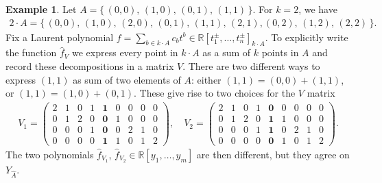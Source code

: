 \documentclass[a4paper,11pt]{amsart}
\theoremstyle{definition}
\newtheorem{example}[theorem]{Example}
\newcommand{\RR}{\mathbb{R}}
\begin{document}
\begin{example}
\label{ex:Vmatrix}
Let $A = \{ \, (0,0), \, (1,0), \, (0,1), \, (1,1) \, \}$. For $k = 2$, we have
\begin{align*}
    2 \cdot A = \{ \, (0,0), \, (1,0), \, (2,0), \, (0,1), \, (1,1), \, (2,1),  (0,2), \, (1,2), \, (2,2) \, \}.
\end{align*}
Fix a Laurent polynomial $f=\sum_{b\in k\cdot A}c_bt^b\in \RR[t_1^\pm,\ldots,t_n^\pm]_{k\cdot A}$. 
To explicitly write the function $\hat{f}_V$ we express every point in $k\cdot A$ as a sum of $k$ points in $A$ and record these decompositions in a matrix $V$.
There are two different ways to express $(1,1)$ as sum of two elements of $A$: either $(1,1) = (0,0) + (1,1)$, or $(1,1) = (1,0) + (0,1)$.
  These give rise to two choices for the $V$ matrix
  \begin{align*}
   V_1 = \begin{pmatrix}
       2 & 1 & 0 & 1 & \mathbf{1} & 0 & 0 & 0& 0 \\
       0 & 1 & 2 & 0 & \mathbf{0} & 1 & 0 & 0& 0  \\
       0 & 0 & 0 & 1 & \mathbf{0} & 0 & 2 & 1 & 0 \\
       0  & 0 & 0 & 0 & \mathbf{1} & 1 & 0 & 1& 2 
   \end{pmatrix}, \quad    V_2 = \begin{pmatrix}
       2 & 1 & 0 & 1 & \mathbf{0} & 0 & 0 & 0& 0 \\
       0 & 1 & 2 & 0 & \mathbf{1} & 1 & 0 & 0& 0  \\
       0 & 0 & 0 & 1 & \mathbf{1} & 0 & 2 & 1 & 0 \\
       0  & 0 & 0 & 0 & \mathbf{0} & 1 & 0 & 1& 2 
   \end{pmatrix}.
\end{align*}
The two polynomials $\hat{f}_{V_1}$, $\hat{f}_{V_2} \in \RR[y_1, \dots , y_m]$ are then different, but they agree on $Y_{\hat{A}}$.
\end{example}
\end{document}
